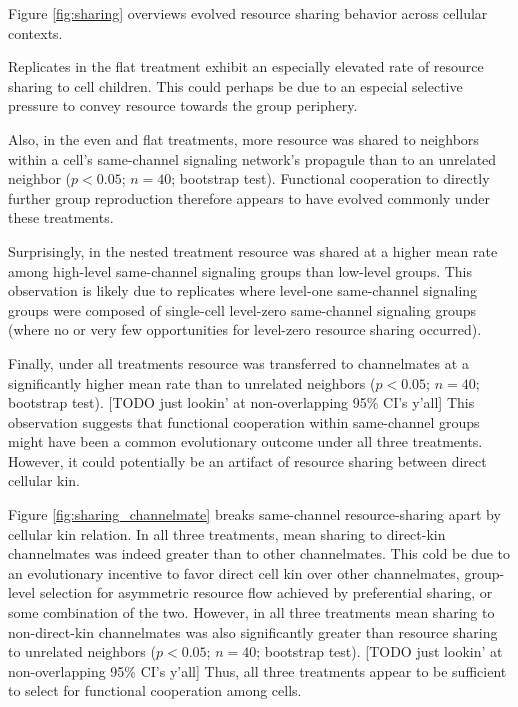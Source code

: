 


Figure \ref{fig:sharing} overviews evolved resource sharing behavior across cellular contexts.

Replicates in the flat treatment exhibit an especially elevated rate of resource sharing to cell children.
This could perhaps be due to an especial selective pressure to convey resource towards the group periphery.

Also, in the even and flat treatments, more resource was shared to neighbors within a cell's same-channel signaling network's propagule than to an unrelated neighbor ($p < 0.05$; $n=40$; bootstrap test).
Functional cooperation to directly further group reproduction therefore appears to have evolved commonly under these treatments.

Surprisingly, in the nested treatment resource was shared at a higher mean rate among high-level same-channel signaling groups than low-level groups.
This observation is likely due to replicates where level-one same-channel signaling groups were composed of single-cell level-zero same-channel signaling groups (where no or very few opportunities for level-zero resource sharing occurred).

Finally, under all treatments resource was transferred to channelmates at a significantly higher mean rate than to unrelated neighbors ($p < 0.05$; $n=40$; bootstrap test).
[TODO just lookin' at non-overlapping 95\% CI's y'all]
This observation suggests that functional cooperation within same-channel groups might have been a common evolutionary outcome under all three treatments.
However, it could potentially be an artifact of resource sharing between direct cellular kin.

Figure \ref{fig:sharing_channelmate} breaks same-channel resource-sharing apart by cellular kin relation.
In all three treatments, mean sharing to direct-kin channelmates was indeed greater than to other channelmates.
This cold be due to an evolutionary incentive to favor direct cell kin over other channelmates, group-level selection for asymmetric resource flow achieved by preferential sharing, or some combination of the two.
However, in all three treatments mean sharing to non-direct-kin channelmates was also significantly greater than resource sharing to unrelated neighbors ($p < 0.05$; $n=40$; bootstrap test).
[TODO just lookin' at non-overlapping 95\% CI's y'all]
Thus, all three treatments appear to be sufficient to select for functional cooperation among cells.

